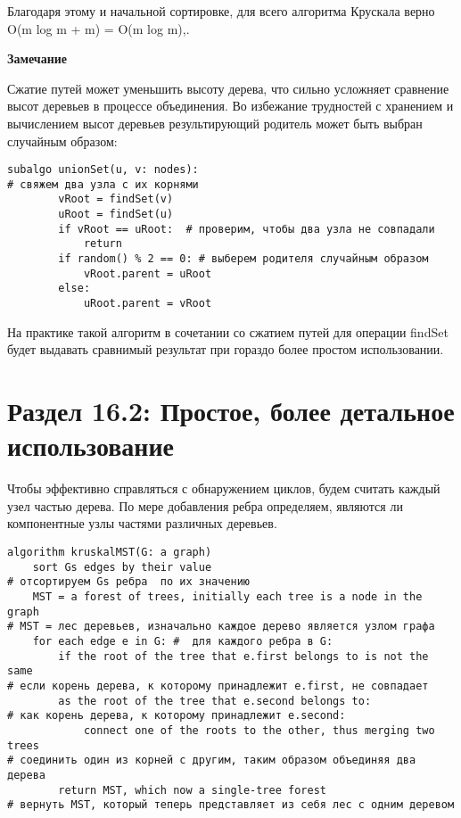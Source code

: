 \vspace{\baselineskip}
Благодаря этому и начальной сортировке, для всего алгоритма Крускала верно O(m log m + m) = O(m log m),. 

\vspace{\baselineskip}
\textbf{Замечание}

\vspace{\baselineskip}
Сжатие путей может уменьшить высоту дерева, что сильно усложняет сравнение высот деревьев в процессе объединения. Во избежание трудностей с хранением и вычислением высот деревьев результирующий родитель может быть выбран случайным образом: 

\vspace{\baselineskip}
\begin{tcolorbox}
\begin{verbatim}
subalgo unionSet(u, v: nodes):
# свяжем два узла с их корнями
		vRoot = findSet(v)
		uRoot = findSet(u)
		if vRoot == uRoot:  # проверим, чтобы два узла не совпадали
			return
		if random() % 2 == 0: # выберем родителя случайным образом
			vRoot.parent = uRoot
		else:
			uRoot.parent = vRoot
\end{verbatim}
\end{tcolorbox}

\vspace{\baselineskip}
На практике такой алгоритм в сочетании со сжатием путей для операции findSet будет выдавать сравнимый результат при гораздо более простом использовании. 

\vspace{\baselineskip}
\section*{Раздел 16.2: Простое, более детальное использование}

\vspace{\baselineskip}
Чтобы эффективно справляться с обнаружением циклов, будем считать каждый узел частью дерева. По мере добавления ребра определяем, являются ли компонентные узлы частями различных деревьев.

\vspace{\baselineskip}
\begin{tcolorbox}
\begin{verbatim}
algorithm kruskalMST(G: a graph)
	sort Gs edges by their value 
# отсортируем Gs ребра  по их значению
	MST = a forest of trees, initially each tree is a node in the graph 
# MST = лес деревьев, изначально каждое дерево является узлом графа
	for each edge e in G: #  для каждого ребра в G:
		if the root of the tree that e.first belongs to is not the same
# если корень дерева, к которому принадлежит e.first, не совпадает
		as the root of the tree that e.second belongs to: 
# как корень дерева, к которому принадлежит e.second:
			connect one of the roots to the other, thus merging two trees
# соединить один из корней с другим, таким образом объединяя два дерева
		return MST, which now a single-tree forest
# вернуть MST, который теперь представляет из себя лес с одним деревом
\end{verbatim}
\end{tcolorbox}

